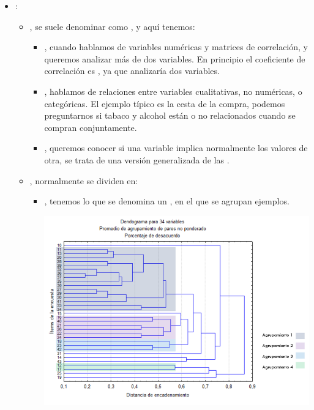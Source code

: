 \begin{itemize}
    \item {}:
    \begin{itemize}
        \item {}, se suele denominar como , y aquí tenemos:
        \begin{itemize}
            \item {}, cuando hablamos de variables numéricas y matrices de correlación, y queremos analizar más de dos variables. En principio el coeficiente de correlación es , ya que analizaría dos variables.
            \item {}, hablamos de relaciones entre variables cualitativas, no numéricas, o categóricas. El ejemplo típico es la cesta de la compra, podemos preguntarnos si tabaco y alcohol están o no relacionados cuando se compran conjuntamente.
            \item {}, queremos conocer si una variable implica normalmente los valores de otra, se trata de una versión generalizada de las .
        \end{itemize}
        \item {}, normalmente se dividen en:
        \begin{itemize}
            \item {}, tenemos lo que se denomina un , en el que se agrupan ejemplos.
            \begin{center}
                \includegraphics[scale=.4]{images/mod01-20.png}

\end{center}
\end{itemize}
\end{itemize}
\end{itemize}
